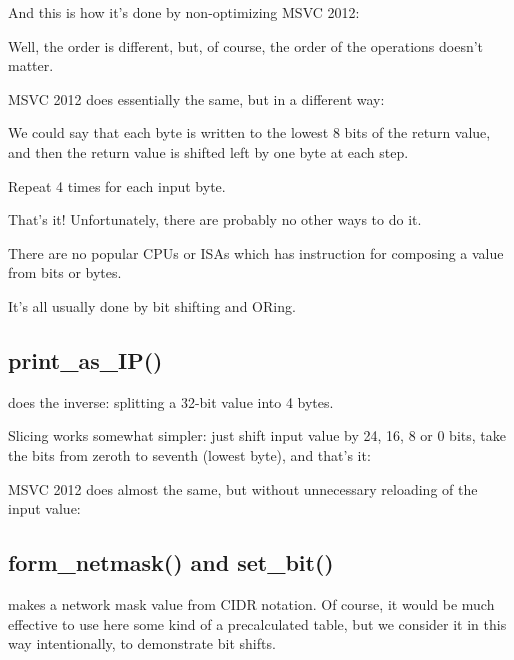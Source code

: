 And this is how it's done by non-optimizing MSVC 2012:



Well, the order is different, but, of course, the order of the operations doesn't matter.

\Optimizing MSVC 2012 does essentially the same, but in a different way:



We could say that each byte is written to the lowest 8 bits of the return value, 
and then the return value is shifted left by one byte at each step.

Repeat 4 times for each input byte.

\par
That's it! Unfortunately, there are probably no other ways to do it.

There are no popular \ac{CPU}s or \ac{ISA}s which has instruction for composing a value from
bits or bytes.

It's all usually done by bit shifting and ORing.

\subsection{print\_as\_IP()}

 does the inverse: splitting a 32-bit value into 4 bytes.

Slicing works somewhat simpler: just shift input value by 24, 16, 8 or 0 bits, take the 
bits from zeroth to seventh (lowest byte), and that's it:



\Optimizing MSVC 2012 does almost the same, but without unnecessary reloading of the input value:



\subsection{form\_netmask() and set\_bit()}

 makes a network mask value from \ac{CIDR} notation.
Of course, it would be much effective to use here some kind of a precalculated table, but we consider it in this
way intentionally, to demonstrate bit shifts.

